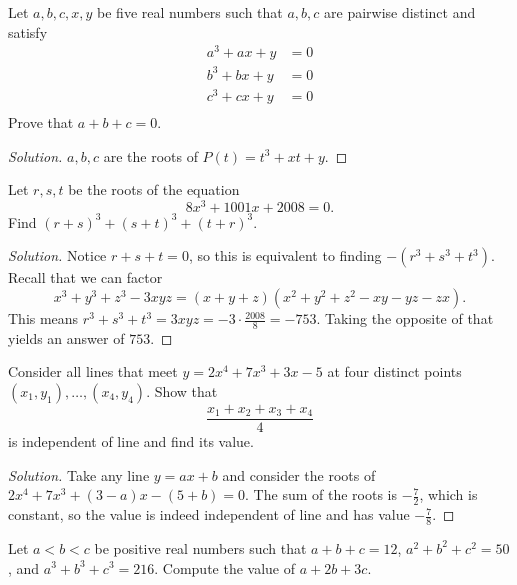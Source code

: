 \begin{prb}[JBMO 1999-1]
Let $a, b, c, x, y$ be five real numbers such that $a, b, c$ are pairwise
distinct and satisfy
\[ \begin{aligned}
a^3 + ax + y &= 0 \\
b^3 + bx + y &= 0 \\
c^3 + cx + y &= 0 \\
\end{aligned} \]
Prove that $a + b + c = 0$.
\end{prb}

\ifsolutions
\begin{proof}[Solution]
$a, b, c$ are the roots of $P(t) = t^3 + xt + y$.
\end{proof}
\fi

\begin{prb}[2008 AIME II-7]
Let $r, s, t$ be the roots of the equation
\[ 8x^3 + 1001x + 2008 = 0. \]
Find $(r + s)^3 + (s + t)^3 + (t + r)^3$.
\end{prb}

\ifsolutions
\begin{proof}[Solution]
Notice $r + s + t = 0$, so this is equivalent to finding $-(r^3 + s^3 + t^3)$.
Recall that we can factor
\[ x^3 + y^3 + z^3 - 3xyz = (x + y + z)(x^2 + y^2 + z^2 - xy - yz - zx). \]
This means $r^3 + s^3 + t^3 = 3xyz = -3 \cdot \frac{2008}{8} = -753$. Taking the
opposite of that yields an answer of $\boxed{753}$.
\end{proof}
\fi

\begin{prb}
Consider all lines that meet $y = 2x^4 + 7x^3 + 3x - 5$ at four distinct points
$(x_1, y_1), \dots, (x_4, y_4)$. Show that
\[ \frac{x_1 + x_2 + x_3 + x_4}{4} \]
is independent of line and find its value.
\end{prb}

\ifsolutions
\begin{proof}[Solution]
Take any line $y = ax + b$ and consider the roots of $2x^4 + 7x^3 + (3 - a)x -
(5 + b) = 0$. The sum of the roots is $-\frac{7}{2}$, which is constant, so the
value is indeed independent of line and has value $\boxed{-\frac{7}{8}}$.
\end{proof}
\fi

\begin{prb}
Let $a < b < c$ be positive real numbers such that $a + b + c = 12$, $a^2 + b^2
+ c^2 = 50$, and $a^3 + b^3 + c^3 = 216$. Compute the value of $a + 2b + 3c$.
\end{prb}

